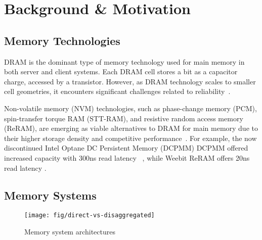 \section{Background \& Motivation}
\label{sec:background}

\subsection{Memory Technologies}
DRAM is the dominant type of memory technology used for main memory in both server and client systems. 
Each DRAM cell stores a bit as a capacitor charge, accessed by a transistor. 
However, as DRAM technology scales to smaller cell geometries, it encounters significant challenges related to reliability~\cite{lee:ddr5:iedm:2023, patil:dve:isca:2021}.

Non-volatile memory (NVM) technologies, such as phase-change memory (PCM), spin-transfer torque RAM (STT-RAM), and resistive random access memory (ReRAM), are emerging as viable alternatives to DRAM for main memory due to their higher storage density and competitive performance~\cite{lee:pcm:isca:2009, kultursay:sttram:ispass:2013, xu:reram:hpca:2015}. 
For example, the now discontinued Intel Optane DC Persistent Memory (DCPMM) DCPMM offered increased capacity with 300ns read latency ~\cite{yang:optane-guide:fast:2020}, while Weebit ReRAM offers 20ns read latency \cite{weebit:skywater-ip}.



\subsection{Memory Systems}

\begin{figure}[!t]
\centering
\texttt{[image: fig/direct-vs-disaggregated]}
\caption{Memory system architectures}
\label{fig:memory-system-architectures}
\vspace{-0.5cm}
\end{figure}


